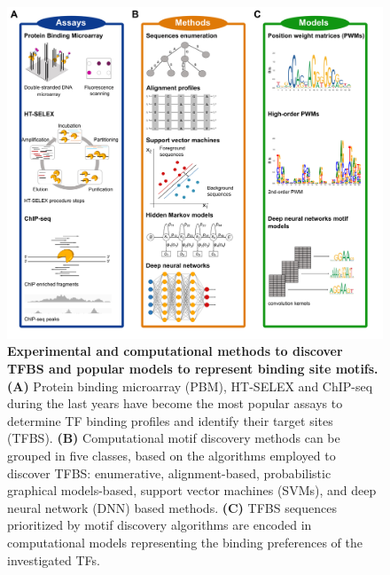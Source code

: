 \documentclass[a4paper, titlepage, openright]{book}
\begin{document}
\begin{figure}
	\centering
	\includegraphics[width=\textwidth]{figures/md.png}
	\caption[Experimental and computational methods to discover TFBS and popular models to represent binding site motifs.]{\textbf{Experimental and computational methods to discover TFBS and popular models to represent binding site motifs. (A)} Protein binding microarray (PBM), HT-SELEX and ChIP-seq during the last years have become the most popular assays to determine TF binding profiles and identify their target sites (TFBS). \textbf{(B)} Computational motif discovery methods can be grouped in five classes, based on the algorithms employed to discover TFBS: enumerative, alignment-based, probabilistic graphical models-based, support vector machines (SVMs), and deep neural network (DNN) based methods. \textbf{(C)} TFBS sequences prioritized by motif discovery algorithms are encoded in computational models representing the binding preferences of the investigated TFs. }
	\label{fig:md}
\end{figure}
\end{document}
